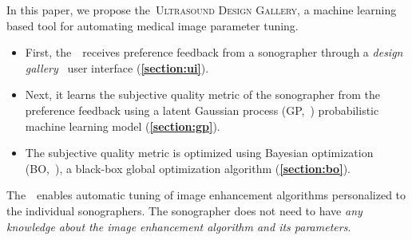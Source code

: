 In this paper, we propose the~\textsc{Ultrasound Design Gallery}, a machine learning based tool for automating medical image parameter tuning.
\begin{itemize}
    \item[\ding{228}] First, the~\usdg~receives preference feedback from a sonographer through a \textit{design gallery}~\cite{brochu_bayesian_2010, 10.1145/3072959.3073598, koyama_sequential_2020, phan_color_2018, pmlr-v119-mikkola20a} user interface (\textbf{\cref{section:ui}}).
    \vspace{0.02in}
  \item[\ding{228}] Next, it learns the subjective quality metric of the sonographer from the preference feedback using a latent Gaussian process (GP,~\cite{rasmussen_gaussian_2006, pmlr-v119-mikkola20a}) probabilistic machine learning model (\textbf{\cref{section:gp}}).
    \vspace{0.02in}
  \item[\ding{228}] The subjective quality metric is optimized using Bayesian optimization (BO,~\cite{shahriari_taking_2016}), a black-box global optimization algorithm (\textbf{\cref{section:bo}}).
\end{itemize}
The~\usdg~enables automatic tuning of image enhancement algorithms personalized to the individual sonographers.
The sonographer does not need to have \textit{any knowledge about the image enhancement algorithm and its parameters}.


